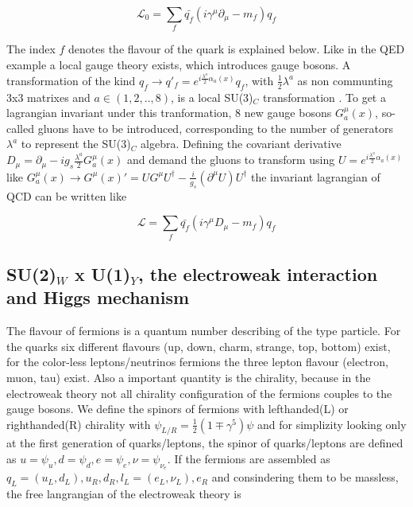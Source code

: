 \begin{equation}
	\label{eq:eq_1_3}
	\mathcal{L}_{0} = \sum_{f} \bar{q_{f}}(i\gamma^{\mu}\partial_{\mu} - m_{f})q_{f}
\end{equation}

The index $f$ denotes the flavour of the quark is explained below. Like in the \gls{QED} example a local gauge theory exists, which introduces gauge bosons. A transformation of the kind $q_{f} \rightarrow q'_{f} = e^{i\frac{\lambda^{a}}{2}\alpha_{a}(x)} q_{f}$, with $\frac{1}{2} \lambda^{a}$ as non communting 3x3 matrixes and $a \in (1, 2, .., 8)$, is a local SU(3)$_{C}$ transformation \cite{QCD}. To get a lagrangian invariant under this tranformation, 8 new gauge bosons $G^{\mu}_{a}(x)$, so-called gluons have to be introduced, corresponding to the number of generators $\lambda^{a}$ to represent the SU(3)$_{C}$ algebra. Defining the covariant derivative $D_{\mu} = \partial_{\mu}-ig_{s}\frac{\lambda^{a}}{2}G^{\mu}_{a}(x)$ and demand the gluons to transform using $U = e^{i\frac{\lambda^{a}}{2}\alpha_{a}(x)}$ like $G^{\mu}_{a}(x) \rightarrow G^{\mu}(x)' = UG^{\mu}U^{\dagger} - \frac{i}{g_s}(\partial^{\mu}U)U^{\dagger}$ the invariant lagrangian of \gls{QCD} can be written like 

\begin{equation}
	\label{eq:eq_1_4}
	\mathcal{L} = \sum_{f} \bar{q_{f}}(i\gamma^{\mu}D_{\mu} - m_{f})q_{f}
\end{equation}

\subsection{SU(2)$_{W}$ x U(1)$_{Y}$, the electroweak interaction and Higgs mechanism}
\label{sec:section_1_1_3}

The flavour of fermions is a quantum number describing of the type particle. For the quarks six different flavours (up, down, charm, strange, top, bottom) exist, for the color-less leptons/neutrinos fermions the three lepton flavour (electron, muon, tau) exist. Also a important quantity is the chirality, because in the electroweak theory not all chirality configuration of the fermions couples to the gauge bosons. We define the spinors of fermions with lefthanded(L) or righthanded(R) chirality with $\psi_{L/R} = \frac{1}{2}(1\mp \gamma^{5})\psi$ and for simplizity looking only at the first generation of quarks/leptons, the spinor of quarks/leptons are defined as $u = \psi_{u}, d = \psi_{d}, e = \psi_{e}, \nu = \psi_{\nu_{e}}$. If the fermions are assembled as $q_{L} = (u_{L}, d_{L}), u_{R}, d_{R}, l_{L} = (e_{L}, \nu_{L}), e_{R}$ and consindering them to be massless, the free langrangian of the electroweak theory is

